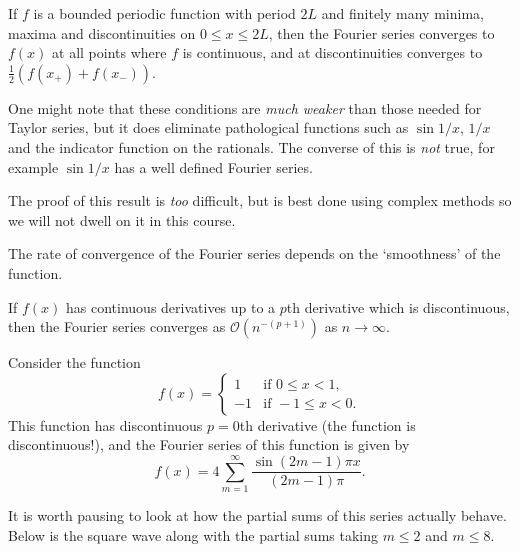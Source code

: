 \documentclass[a4paper]{scrartcl}
\begin{document}
\begin{theorem}
    If $f$ is a bounded periodic function with period $2L$ and finitely many minima, maxima and discontinuities on $0 \leq x \leq 2L$, then the Fourier series converges to $f(x)$ at all points where $f$ is continuous, and at discontinuities converges to $\frac{1}{2}(f(x_+) + f(x_-))$.
\end{theorem}

One might note that these conditions are \emph{much weaker} than those needed for Taylor series, but it does eliminate pathological functions such as $\sin 1/x$, $1/x$ and the indicator function on the rationals.
The converse of this is \emph{not} true, for example $\sin 1/x$ has a well defined Fourier series.

The proof of this result is \emph{too} difficult, but is best done using complex methods so we will not dwell on it in this course.

The rate of convergence of the Fourier series depends on the `smoothness' of the function.

\begin{theorem}
If $f(x)$ has continuous derivatives up to a $p$th derivative which is discontinuous, then the Fourier series converges as $\mathcal{O}(n^{-(p + 1)})$ as $n \rightarrow \infty$.
\end{theorem}

\begin{example}\label{ex:square}
    Consider the function
    $$
    f(x) = \begin{cases}
        1 &\mbox{if } 0 \leq x < 1, \\
        -1 &\mbox{if } -1 \leq x < 0.
       \end{cases}
    $$
    This function has discontinuous $p = 0$th derivative (the function is discontinuous!), and the Fourier series of this function is given by
    $$
    f(x) = 4 \sum_{m=1}^{\infty} \frac{\sin (2 m-1) \pi x}{(2 m-1) \pi}.
    $$
\end{example}

It is worth pausing to look at how the partial sums of this series actually behave. Below is the square wave along with the partial sums taking $m \leq 2$ and $m \leq 8$.
\end{document}
